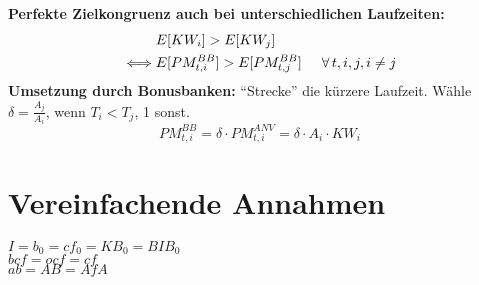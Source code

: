 \documentclass[leqno]{scrartcl}
\begin{document}
\begin{multicols}{4}
\textbf{Perfekte Zielkongruenz auch bei unterschiedlichen Laufzeiten:}
  \begin{align*}
    &E[KW_i] > E[KW_j]\\
    \iff & E[PM^{BB}_{t,i}] > E[PM^{BB}_{t,j}] \hspace{0.5cm} \forall\, t,i,j,i \neq j
  \end{align*}
\textbf{Umsetzung durch Bonusbanken:}
``Strecke'' die kürzere Laufzeit. Wähle $\delta = \frac{A_j}{A_i}$, wenn $T_i < T_j$, 1 sonst.
  \begin{equation*}
    PM^{BB}_{t,i} = \delta \cdot PM^{ANV}_{t,i} = \delta \cdot A_{i} \cdot KW_i
  \end{equation*}


\appendix 
\section{Vereinfachende Annahmen}
$I=b_0=cf_0=KB_0=BIB_0$\\
$bcf=ocf=cf$\\
$ab=AB=AfA$  


\end{multicols}
\end{document}

